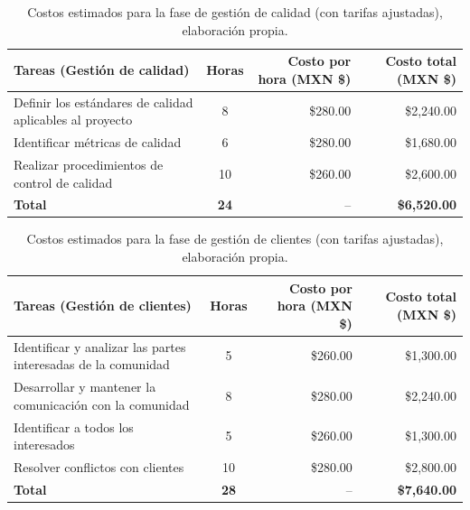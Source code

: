\begin{table}[H]
	\centering
	\renewcommand{\arraystretch}{1.6}
	\setlength{\tabcolsep}{10pt}
	\Huge
	\begin{adjustbox}{max width=\textwidth}
		\begin{tabular}{|p{9.5cm}|c|r|r|}
			\hline
			\textbf{Tareas (Gestión de calidad)} & \textbf{Horas} & \textbf{Costo por hora (MXN \$)} & \textbf{Costo total (MXN \$)} \\ \hline
			Definir los estándares de calidad aplicables al proyecto & 8 & \$280.00 & \$2,240.00 \\ \hline
			Identificar métricas de calidad & 6 & \$280.00 & \$1,680.00 \\ \hline
			Realizar procedimientos de control de calidad & 10 & \$260.00 & \$2,600.00 \\ \hline
			\textbf{Total} & \textbf{24} & -- & \textbf{\$6,520.00} \\ \hline
		\end{tabular}
	\end{adjustbox}
	\caption[Costos estimados para la fase de gestión de calidad (con tarifas ajustadas)]{Costos estimados para la fase de gestión de calidad (con tarifas ajustadas), elaboración propia.} 
	\label{tab:costos_calidad_actualizado}
\end{table}

\begin{table}[H]
	\centering
	\renewcommand{\arraystretch}{1.6}
	\setlength{\tabcolsep}{10pt}
	\Huge
	\begin{adjustbox}{max width=\textwidth}
		\begin{tabular}{|p{9.5cm}|c|r|r|}
			\hline
			\textbf{Tareas (Gestión de clientes)} & \textbf{Horas} & \textbf{Costo por hora (MXN \$)} & \textbf{Costo total (MXN \$)} \\ \hline
			Identificar y analizar las partes interesadas de la comunidad & 5 & \$260.00 & \$1,300.00 \\ \hline
			Desarrollar y mantener la comunicación con la comunidad & 8 & \$280.00 & \$2,240.00 \\ \hline
			Identificar a todos los interesados & 5 & \$260.00 & \$1,300.00 \\ \hline
			Resolver conflictos con clientes & 10 & \$280.00 & \$2,800.00 \\ \hline
			\textbf{Total} & \textbf{28} & -- & \textbf{\$7,640.00} \\ \hline
		\end{tabular}
	\end{adjustbox}
	\caption[Costos estimados para la fase de gestión de clientes (con tarifas ajustadas)]{Costos estimados para la fase de gestión de clientes (con tarifas ajustadas), elaboración propia.} 
	\label{tab:costos_clientes_actualizado}
\end{table}

